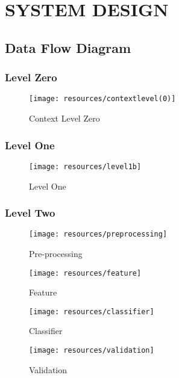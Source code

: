 \newpage
\section{SYSTEM DESIGN}
\subsection{Data Flow Diagram}
\subsubsection{Level Zero}
\begin{figure}[h]
        \centering
        \texttt{[image: resources/contextlevel(0)]}
        \caption{Context Level Zero}
        \label{fig:contextlevel}
\end{figure}
\subsubsection{Level One}
\begin{figure}[h]
        \centering
        \texttt{[image: resources/level1b]}
        \caption{Level One}
        \label{fig:level1b}
\end{figure}
\newpage
\subsubsection{Level Two}
\vspace{20mm}
\begin{figure}[h]
        \centering
        \texttt{[image: resources/preprocessing]}
        \caption{Pre-processing}
        \label{fig:pre-processing}
\end{figure}
\vspace{20mm}
\begin{figure}[h]
        \centering
        \texttt{[image: resources/feature]}
        \caption{Feature}
        \label{fig:feature}
\end{figure}
\begin{figure}[h]
        \centering
        \texttt{[image: resources/classifier]}
        \caption{Classifier}
        \label{fig:classifier}
\end{figure}
\begin{figure}[h]
        \centering
        \texttt{[image: resources/validation]}
        \caption{Validation}
        \label{fig:validation}
\end{figure}


